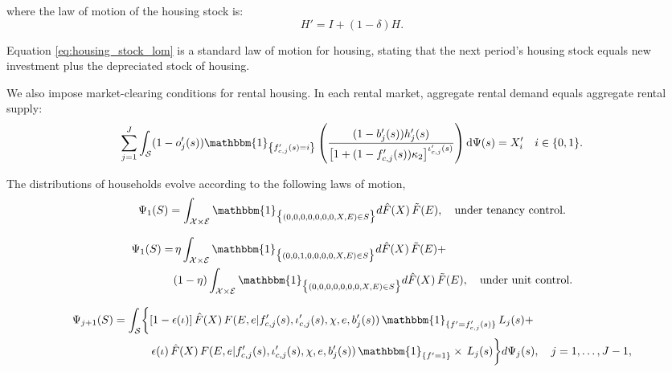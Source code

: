 \documentclass[parskip=full]{article}
\begin{document}
\noindent where the law of motion of the housing stock is: 
\begin{equation}\label{eq:housing_stock_lom}
H'=I+(1-\delta)H.
\end{equation}

\noindent Equation \eqref{eq:housing_stock_lom} is a standard law of motion for housing, stating that the next period's housing stock equals new investment plus the depreciated stock of housing. 

We also impose market-clearing conditions for rental housing. In each rental market, aggregate rental demand equals aggregate rental supply:
\begin{equation}\label{eq:rental_housing_clearing_condition}
  \sum_{j=1}^J \int_\mathcal{S} (1-o'_{j}(s))\mathbbm{1}_{\left\{f'_{c,j}(s)=i\right\}}\left(\frac{(1-b'_{j}(s))h'_{j}(s)}{\left[1+(1-f'_{c,j}(s))\kappa_{2}\right]^{\iota'_{c,j}(s)}}\right) \mathrm{d}\Psi(s) = X'_{i} \quad i \in \{0,1\}.
\end{equation}

The distributions of households evolve according to the following laws of motion,
\begin{equation}\label{eq:lom1}
\Psi_{1}(S) = \int_{\mathcal{X} \times \mathcal{E}} \mathbbm{1}_{\big\{ (0,0,0,0,0,0,0,X,E) \in S \big\}} d\hat{F}(X)\, \tilde{F}(E), \quad \text{under tenancy control.}
\end{equation}

\begin{equation}\label{eq:lom1_2}
\begin{split}
\Psi_{1}(S) = & \, \eta \int_{\mathcal{X} \times \mathcal{E}} \mathbbm{1}_{\big\{ (0,0,1,0,0,0,0,X,E) \in S \big\}} d\hat{F}(X)\, \tilde{F}(E)+ \\ & (1-\eta) \int_{\mathcal{X} \times \mathcal{E}} \mathbbm{1}_{\big\{ (0,0,0,0,0,0,0,X,E) \in S \big\}} d\hat{F}(X)\, \tilde{F}(E), \quad \text{under unit control.}
\end{split}
\end{equation}

\begin{equation}\label{eq:lom2}
\begin{split}
\Psi_{j+1}(S) = \int_{\mathcal{S}} \biggl\{ 
& [1-\epsilon(\iota)]\, \hat{F}(X)\, F(E,e | f'_{c,j}(s), \iota'_{c,j}(s), \chi, e, b'_j(s))\, \mathbbm{1}_{\{ f' = f'_{c,j}(s) \}}\, L_j(s)+ \\ & \, \epsilon(\iota)\, \hat{F}(X)\, F(E,e | f'_{c,j}(s), \iota'_{c,j}(s), \chi, e, b'_j(s))\, \mathbbm{1}_{\{ f' = 1 \}} \times \, L_j(s)
\biggr\} d\Psi_j(s), \quad j=1,\ldots,J-1,
\end{split}
\end{equation}
\end{document}
